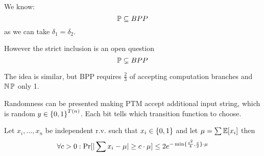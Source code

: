 \begin{note}
	We know:
	\[ \operatorname{\mathbb{P}} \subseteq BPP \]
	as we can take $\delta_1 = \delta_2$.

	However the strict inclusion is an open question
	\[ \operatorname{\mathbb{P}} \subsetneq BPP \]
\end{note}

\begin{note}
	The idea is similar, but BPP requires $\frac{2}{3}$ of accepting computation branches and $\operatorname{\operatorname{\mathbb{N}}\mathbb{P}}$ only 1.
\end{note}

\begin{definition}
	Randomness can be presented making PTM accept additional input string, which is random $y \in \operatorname{\{ 0, 1 \}}^{T(n)}$.
	Each bit tells which transition function to choose.
\end{definition}

\begin{theorem}\label{chernoff}
	Let $x_i, \ldots, x_n$ be independent r.v. such that $x_i \in \operatorname{\{ 0, 1 \}}$ and let $\mu = \sum \mathbb{E}[x_i]$ then
	\[ \forall c > 0: \operatorname{Pr}[|\sum x_i - \mu| \geq c \cdot \mu ] \leq 2e^{-\min\{ \frac{c^2}{4}, \frac{c}{2} \} \cdot \mu } \]
\end{theorem}

